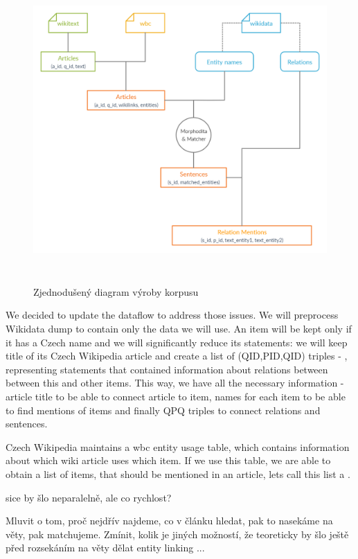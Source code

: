 \begin{figure}[p]\centering
\includegraphics[width=140mm, height=117mm]{./img/Corpus_diagram}
\caption{Zjednodušený diagram výroby korpusu}
\label{obr03:Nhust}
\end{figure}

We decided to update the dataflow to address those issues. We will preprocess Wikidata dump to contain only the data we will use. An item will be kept only if it has a Czech name and we will significantly reduce its statements: we will keep title of its Czech Wikipedia article and create a list of (QID,PID,QID) triples - , representing statements that contained information about relations between between this and other items. This way, we have all the necessary information - article title to be able to connect article to item, names for each item to be able to find mentions of items and finally QPQ triples to connect relations and sentences.


Czech Wikipedia maintains a wbc entity usage table, which contains information about which wiki article uses which item. If we use this table, we are able to obtain a list of items, that should be mentioned in an article, lets call this list a . 






sice by šlo neparalelně, ale co rychlost?

Mluvit o tom, proč nejdřív najdeme, co v článku hledat, pak to nasekáme na věty, pak matchujeme. Zmínit, kolik je jiných možností, že teoreticky by šlo ještě před rozsekáním na věty dělat entity linking ...

